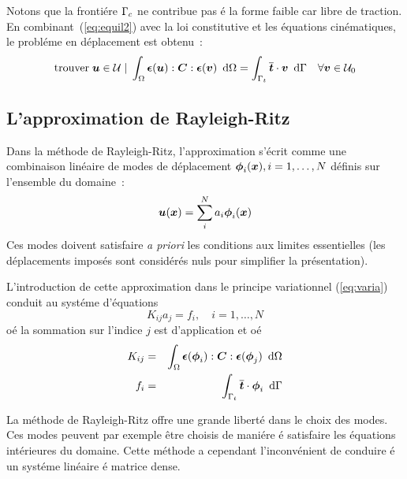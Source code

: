 Notons que la fronti\'ere ${\Gamma}_c$ ne contribue pas \'e la forme
faible car libre de traction.
En combinant~(\ref{eq:equil2}) avec la loi constitutive
et les \'equations cin\'ematiques, le
probl\'eme en d\'eplacement est obtenu~:
\begin{equation}
    \label{eq:varia}
    \text{trouver} \; \bfu\in\cu  \; \vert \;
    \int_{\Ome}   \bfeps(\bfu):\bfC:\bfeps(\bfv) \dint \Ome =
    \int_{\Gam_t} \ov{\bft}\cdot\bfv  \dint \Gam
    \quad \forall \bfv \in \cu_0
\end{equation}

\subsection{L'approximation  de Rayleigh-Ritz}


Dans la m\'ethode de Rayleigh-Ritz, l'approximation s'\'ecrit comme
une combinaison lin\'eaire de modes de d\'eplacement $\mbox{\boldmath $\phi$}_i(\mbox{\boldmath $x$}), i = 1,
\dots, N$ d\'efinis sur l'ensemble du domaine~:
\begin{equation}
    \mbox{\boldmath $u$}(\mbox{\boldmath $x$}) = \sum_i^N a_i \mbox{\boldmath $\phi$}_i(\mbox{\boldmath $x$})
\end{equation}
Ces modes doivent satisfaire \emph{a priori} les conditions
aux limites
essentielles (les d\'eplacements impos\'es sont consid\'er\'es nuls
pour simplifier la pr\'esentation).





L'introduction de cette
approximation dans le principe variationnel (\ref{eq:varia}) conduit au
syst\'eme d'\'equations
\begin{equation}
\label{eq:global_systeme}
K_{ij} a_j = f_i, \quad i = 1, \ldots, N
\end{equation}
o\'e la sommation sur l'indice $j$ est d'application et o\'e
\begin{eqnarray}
K_{ij} & = & \int_{{\Omega}}   \mbox{\boldmath $\epsilon$}(\mbox{\boldmath $\phi$}_i):\mbox{\boldmath $C$}:\mbox{\boldmath $\epsilon$}(\mbox{\boldmath $\phi$}_j) \mbox{\, \ensuremath{\mathrm{d}}}
{\Omega} \\
f_i & = & \int_{{\Gamma}_t} \overline{\mbox{\boldmath $t$}}\cdot\mbox{\boldmath $\phi$}_i  \mbox{\, \ensuremath{\mathrm{d}}} {\Gamma}
\end{eqnarray}

La m\'ethode de Rayleigh-Ritz offre une grande
libert\'e dans le choix des modes.  Ces modes peuvent par exemple
\^etre choisis de mani\'ere \'e satisfaire les \'equations
int\'erieures du domaine.  Cette m\'ethode a cependant
l'inconv\'enient de conduire \'e un syst\'eme lin\'eaire \'e matrice
dense.



